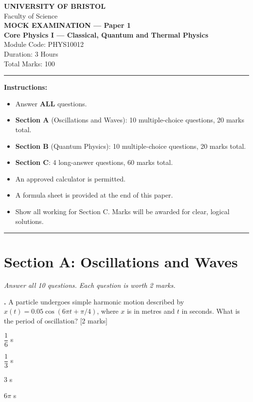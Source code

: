 \documentclass[12pt,a4paper]{article}
\newcounter{mcqcounter}
\newcommand{\mcq}[1]{%
  \stepcounter{mcqcounter}%
  \vspace{0.3cm}%
  \noindent\textbf{\themcqcounter.} #1 \hfill [2 marks]%
  \vspace{0.1cm}%
}
\begin{document}
\begin{center}
{\Large\textbf{UNIVERSITY OF BRISTOL}}\\[0.3cm]
{\large Faculty of Science}\\[0.5cm]
{\Large\textbf{MOCK EXAMINATION --- Paper 1}}\\[0.3cm]
{\large\textbf{Core Physics I --- Classical, Quantum and Thermal Physics}}\\[0.2cm]
{\large Module Code: PHYS10012}\\[0.5cm]
{\large Duration: 3 Hours}\\[0.3cm]
{\large Total Marks: 100}\\[0.5cm]
\end{center}

\noindent\rule{\textwidth}{0.4pt}

\vspace{0.3cm}
\noindent\textbf{Instructions:}
\begin{itemize}[itemsep=0.1cm]
\item Answer \textbf{ALL} questions.
\item \textbf{Section A} (Oscillations and Waves): 10 multiple-choice questions, 20 marks total.
\item \textbf{Section B} (Quantum Physics): 10 multiple-choice questions, 20 marks total.
\item \textbf{Section C}: 4 long-answer questions, 60 marks total.
\item An approved calculator is permitted.
\item A formula sheet is provided at the end of this paper.
\item Show all working for Section C. Marks will be awarded for clear, logical solutions.
\end{itemize}

\noindent\rule{\textwidth}{0.4pt}
\newpage

\section*{Section A: Oscillations and Waves}
\noindent\textit{Answer all 10 questions. Each question is worth 2 marks.}\\[0.3cm]

\setcounter{mcqcounter}{0}

\mcq{A particle undergoes simple harmonic motion described by $x(t) = 0.05\cos(6\pi t + \pi/4)$, where $x$ is in metres and $t$ in seconds. What is the period of oscillation?}
\begin{choices}
\item $\dfrac{1}{6}$ s
\item $\dfrac{1}{3}$ s
\item $3$ s
\item $6\pi$ s
\end{choices}
\end{document}
